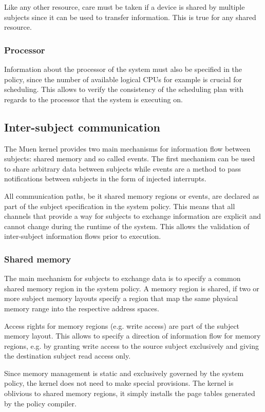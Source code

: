 Like any other resource, care must be taken if a device is shared by multiple
subjects since it can be used to transfer information. This is true for any
shared resource.

\subsubsection{Processor}
Information about the processor of the system must also be specified in the
policy, since the number of available logical CPUs for example is crucial for
scheduling. This allows to verify the consistency of the scheduling plan with
regards to the processor that the system is executing on.

\subsection{Inter-subject communication}
The Muen kernel provides two main mechanisms for information flow between
subjects: shared memory and so called events. The first mechanism can be used
to share arbitrary data between subjects while events are a method to pass
notifications between subjects in the form of injected interrupts.

All communication paths, be it shared memory regions or events, are declared as
part of the subject specification in the system policy. This means that all
channels that provide a way for subjects to exchange information are explicit
and cannot change during the runtime of the system. This allows the validation
of inter-subject information flows prior to execution.

\subsubsection{Shared memory}
The main mechanism for subjects to exchange data is to specify a common shared
memory region in the system policy. A memory region is shared, if two or more
subject memory layouts specify a region that map the same physical memory range
into the respective address spaces.

Access rights for memory regions (e.g. write access) are part of the subject
memory layout. This allows to specify a direction of information flow for memory
regions, e.g. by granting write access to the source subject exclusively and
giving the destination subject read access only.

Since memory management is static and exclusively governed by the system policy,
the kernel does not need to make special provisions. The kernel is oblivious to
shared memory regions, it simply installs the page tables generated by the
policy compiler.

